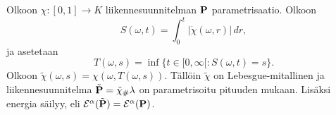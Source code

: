 \documentclass[12pt,oneside,a4paper]{amsbook} %
\begin{document}
\begin{lemma}\label{le:parametrizedByLength}
    Olkoon $\chi:[0,1] \to K$ liikennesuunnitelman $\P$ parametrisaatio. Olkoon 
    \begin{equation*}
        S(\omega, t) = \int_0^t|\dot\chi(\omega, r)| \, dr,
    \end{equation*}
    ja asetetaan
    \begin{equation*}
        T(\omega, s) = \inf\{t \in [0,\infty[ : S(\omega, t) = s\}.
    \end{equation*} 
    Olkoon $\tilde \chi(\omega, s) = \chi(\omega, T(\omega, s))$. Tällöin $\tilde\chi$ on Lebesgue-mitallinen ja liikennesuunnitelma $\tilde \P = \tilde \chi_\# \lambda $ on parametrisoitu pituuden mukaan. Lisäksi energia säilyy, eli $\E^\alpha(\tilde\P) = \E^\alpha(\P)$.
\end{lemma}
\end{document}
